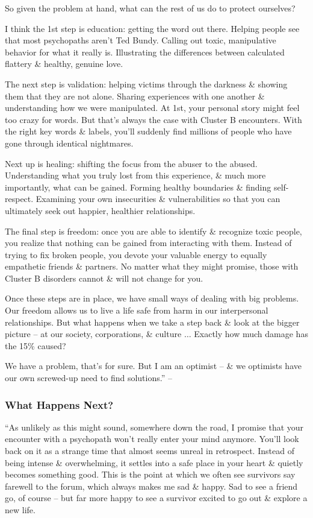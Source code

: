 \documentclass{article}
\numberwithin{equation}{section}
\begin{document}
So given the problem at hand, what can the rest of us do to protect ourselves?

I think the 1st step is education: getting the word out there. Helping people see that most psychopaths aren't Ted Bundy. Calling out toxic, manipulative behavior for what it really is. Illustrating the differences between calculated flattery \& healthy, genuine love.

The next step is validation: helping victims through the darkness \& showing them that they are not alone. Sharing experiences with one another \& understanding how we were manipulated. At 1st, your personal story might feel too crazy for words. But that's always the case with Cluster B encounters. With the right key words \& labels, you'll suddenly find millions of people who have gone through identical nightmares.

Next up is healing: shifting the focus from the abuser to the abused. Understanding what you truly lost from this experience, \& much more importantly, what can be gained. Forming healthy boundaries \& finding self-respect. Examining your own insecurities \& vulnerabilities so that you can ultimately seek out happier, healthier relationships.

The final step is freedom: once you are able to identify \& recognize toxic people, you realize that nothing can be gained from interacting with them. Instead of trying to fix broken people, you devote your valuable energy to equally empathetic friends \& partners. No matter what they might promise, those with Cluster B disorders cannot \& will not change for you.

Once these steps are in place, we have small ways of dealing with big problems. Our freedom allows us to live a life safe from harm in our interpersonal relationships. But what happens when we take a step back \& look at the bigger picture -- at our society, corporations, \& culture $\ldots$ Exactly how much damage has the 15\% caused?

We have a problem, that's for sure. But I am an optimist -- \& we optimists have our own screwed-up need to find solutions.'' -- \cite[pp. 196--199]{MacKenzie2015}

\subsubsection{What Happens Next?}
``As unlikely as this might sound, somewhere down the road, I promise that your encounter with a psychopath won't really enter your mind anymore. You'll look back on it as a strange time that almost seems unreal in retrospect. Instead of being intense \& overwhelming, it settles into a safe place in your heart \& quietly becomes something good. This is the point at which we often see survivors say farewell to the forum, which always makes me sad \& happy. Sad to see a friend go, of course -- but far more happy to see a survivor excited to go out \& explore a new life.
\end{document}
